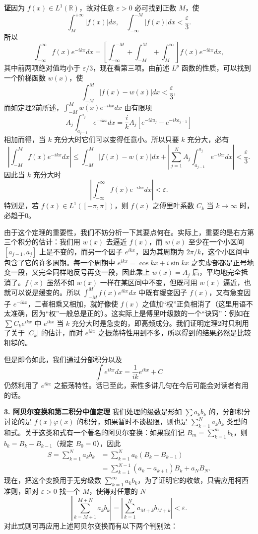 \noindent\textbf{证}\quad 因为 $f(x)\in L^1(\mathbb R)$，故对任意 $\varepsilon>0$ 必可找到正数 $M$，使
\[
 \int_M^{+\infty}|f(x)|dx,\quad \int_{-\infty}^{-M}|f(x)|dx<\frac\varepsilon3.
\]
所以
\[
 \int_{-\infty}^{\infty}f(x)e^{-ikx}dx
 =\left[\int_{-\infty}^{-M}+\int_{-M}^{M}+\int_M^{\infty}\right]f(x)e^{-ikx}dx,
\]
其中前两项绝对值均小于 $\varepsilon/3$，现在看第三项。由前述 $L^p$ 函数的性质，可以找到一个阶梯函数 $w(x)$，使
\[
 \int_{-M}^{M}|f(x)-w(x)|dx<\frac\varepsilon3,
\]
而如定理2前所述，$\int_{-M}^{M}w(x)e^{-ikx}dx$ 由有限项
\[
 A_j\int_{a_{j-1}}^{a_j}e^{-ikx}dx
 =\frac{i}{k}A_j\left[e^{-ika_j}-e^{-ika_{j-1}}\right]
\]
相加而得，当 $k$ 充分大时它们可以变得任意小。所以只要 $k$ 充分大，必有
\[
 \left|\int_{-M}^{M}f(x)e^{-ikx}dx\right|
 \le\int_{-M}^{M}|f(x)-w(x)|dx
 +\left|\sum_{j=1}^{N}A_j\int_{a_{j-1}}^{a_j}e^{-ikx}dx\right|
 <\frac\varepsilon3.
\]
因此当 $k$ 充分大时
\[
 \left|\int_{-\infty}^{\infty}f(x)e^{-ikx}dx\right|<\varepsilon.
\]
特别是，若 $f(x)\in L^1([ -\pi,\pi])$，则 $f(x)$ 之傅里叶系数 $C_k$ 当 $k\to\infty$ 时，必趋于0。

由于这个定理的重要性，我们不妨分析一下其要点何在。实际上，重要的是右方第三个积分的估计：我们用 $w(x)$ 去逼近 $f(x)$，而 $w(x)$ 至少在一个小区间 $[a_{j-1},a_j]$ 上是不变的，而另一个因子 $e^{ikx}$，因为其周期为 $2\pi/k$，这个小区间中包含了它的许多周期。每一个周期中 $e^{ikx}=\cos kx+i\sin kx$ 之实虚部都是正号地变一段，又完全同样地反号再变一段，因此乘上 $w(x)=A_j$ 后，平均地完全抵消了。$f(x)$ 虽然不如 $w(x)$ 一样在某区间中不变，但既可用 $w(x)$ 逼近，也就可以说是缓变的。所以 $\int_{-M}^{M}f(x)e^{ikx}dx$ 中既有缓变因子 $f(x)$，又有急变因子 $e^{-ikx}$，二者相乘又相加，就好像使 $f(x)$ 之值加“权”正负相消了（这里用语不太准确，因为“权”一般总是正的）。这实际上是傅里叶级数的一个“诀窍”：例如在 $\sum C_ke^{ikx}$ 中 $e^{ikx}$ 当 $k$ 充分大时是急变的，即高频成分。我们证明定理2时只利用了关于 $|C_k|$ 的估计，而对 $e^{ikx}$ 之振荡特性用到不多，所以得到的结果必然是比较粗糙的。

但是即令如此，我们通过分部积分以及
\[
 \int e^{ikx}dx=\frac1{ik}e^{ikx}+C
\]
仍然利用了 $e^{ikx}$ 之振荡特性。话已至此，索性多讲几句在今后可能会对读者有用的话。

\noindent\textbf{3. 阿贝尔变换和第二积分中值定理}\quad
我们处理的级数是形如 $\sum a_kb_k$ 的，分部积分讨论的是 $f(x)\varphi(x)$ 的积分，如果暂时不谈极限，则也是 $\sum_{k=1}^{N}a_kb_k$ 类型的和式。关于这类和式有一个著名的阿贝尔变换：如果我们记 $B_m=\sum_{k=1}^{m}b_k$，则 $b_k=B_k-B_{k-1}$（规定 $B_0=0$），因此
\begin{equation}
 \begin{aligned}
 S=\sum_{k=1}^{N}a_kb_k
 &=\sum_{k=1}^{N}a_k(B_k-B_{k-1})\\
 &=\sum_{k=1}^{N-1}(a_k-a_{k+1})B_k+a_NB_N.
 \end{aligned}
 \tag{21}
\end{equation}
现在，把这个变换用于无穷级数 $\sum_{k=1}^{\infty}a_kb_k$，为了证明它的收敛，只需应用柯西准则，即对 $\varepsilon>0$ 找一个 $M$，使得对任意的 $N$
\[
 \left|\sum_{k=M+1}^{M+N}a_kb_k\right|
 =\left|\sum_{k=1}^{N}a_{M+k}b_{M+k}\right|<\varepsilon.
\]
对此式则可再应用上述阿贝尔变换而有以下两个判别法：

